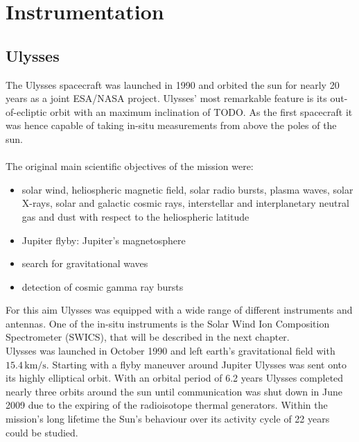 
\chapter{Instrumentation} %

\label{ChapterInstrumentation} 



\section{Ulysses}
The Ulysses spacecraft was launched in 1990 and orbited the sun for nearly 20 years as a joint ESA/NASA project.
Ulysses' most remarkable feature is its out-of-ecliptic orbit with an maximum inclination of TODO.
As the first spacecraft it was hence capable of taking in-situ measurements from above the poles of the sun.
\\ \\
The original main scientific objectives of the mission were:
\begin{itemize}
	\item solar wind, heliospheric magnetic field, solar radio bursts, plasma waves, solar X-rays, solar and galactic cosmic rays, interstellar and interplanetary neutral gas and dust with respect to the heliospheric latitude
	\item Jupiter flyby: Jupiter's magnetosphere
	\item search for gravitational waves
	\item detection of cosmic gamma ray bursts
\end{itemize}
For this aim Ulysses was equipped with a wide range of different instruments and antennas. One of the in-situ instruments is the Solar Wind Ion Composition Spectrometer (SWICS), that will be described in the next chapter.\\
Ulysses was launched in October 1990 and left earth's gravitational field with $15.4\,\mathrm{km/s}$. Starting with a flyby maneuver around Jupiter Ulysses was sent onto its highly elliptical orbit.
With an orbital period of 6.2 years Ulysses completed nearly three orbits around the sun until communication was shut down in June 2009 due to the expiring of the radioisotope thermal generators.
Within the mission's long lifetime the Sun's behaviour over its activity cycle of 22 years could be studied. 
